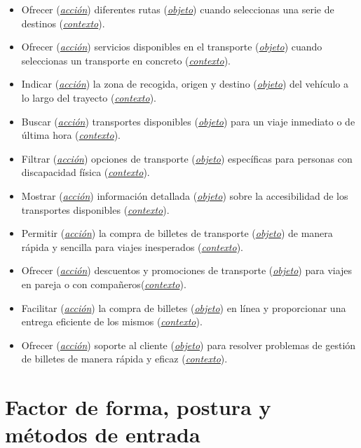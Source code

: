\begin{itemize}
    \item Ofrecer (\textit{\underline{acción}}) diferentes rutas (\textit{\underline{objeto}}) cuando seleccionas una serie de destinos (\textit{\underline{contexto}}).
    \item Ofrecer (\textit{\underline{acción}}) servicios disponibles en el transporte (\textit{\underline{objeto}}) cuando seleccionas un transporte en concreto (\textit{\underline{contexto}}).
    \item Indicar (\textit{\underline{acción}}) la zona de recogida, origen y destino (\textit{\underline{objeto}}) del vehículo a lo largo del trayecto (\textit{\underline{contexto}}).
    \item Buscar (\textit{\underline{acción}}) transportes disponibles (\textit{\underline{objeto}}) para un viaje inmediato o de última hora (\textit{\underline{contexto}}).
    \item Filtrar (\textit{\underline{acción}}) opciones de transporte (\textit{\underline{objeto}}) específicas para personas con discapacidad física (\textit{\underline{contexto}}).
    \item Mostrar (\textit{\underline{acción}}) información detallada (\textit{\underline{objeto}}) sobre la accesibilidad de los transportes disponibles (\textit{\underline{contexto}}).
    \item Permitir (\textit{\underline{acción}}) la compra de billetes de transporte (\textit{\underline{objeto}}) de manera rápida y sencilla para viajes inesperados (\textit{\underline{contexto}}).
    \item Ofrecer (\textit{\underline{acción}}) descuentos y promociones de transporte (\textit{\underline{objeto}}) para viajes en pareja o con compañeros(\textit{\underline{contexto}}).
    \item Facilitar (\textit{\underline{acción}}) la compra de billetes (\textit{\underline{objeto}}) en línea y proporcionar una entrega eficiente de los mismos (\textit{\underline{contexto}}).
    \item Ofrecer (\textit{\underline{acción}}) soporte al cliente (\textit{\underline{objeto}}) para resolver problemas de gestión de billetes de manera rápida y eficaz (\textit{\underline{contexto}}).
\end{itemize}

\section{Factor de forma, postura y métodos de entrada}
